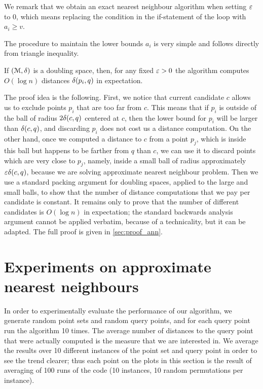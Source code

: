 We remark that we obtain an exact nearest neighbour algorithm
when setting $\varepsilon$ to $0$, which means 
replacing the condition in the if-statement of the loop
with $a_i\geq v$.

The procedure to maintain the lower bounds $a_i$
is very simple and follows directly
from triangle inequality.

\begin{algorithmic}
    \EndFor
\EndProcedure
\end{algorithmic}

\begin{theorem}
\label{thm:ann_bound}
    If $(\mathcal{M}, \delta)$ is a doubling space, then, for any fixed $\varepsilon > 0$ the
    algorithm computes $O(\log n)$ distances $\delta(p_i, q)$ in expectation.
\end{theorem}

The proof idea is the following. First, we notice
that current candidate $c$ allows us to exclude points
$p_i$ that are too far from $c$. This means that if $p_i$ is
outside of the ball of radius $2\delta(c, q)$ centered at $c$, then the lower
bound for $p_i$ will be larger than $\delta(c, q)$,
and discarding $p_i$ does not cost us a distance computation.
On the other hand, once we computed a distance to $c$
from a point $p_j$, which is inside this ball but happens to be farther from $q$ than $c$,
we can use it to discard points which are very close to $p_j$, 
namely, inside a small ball of radius approximately $\varepsilon \delta(c, q)$, because we
are solving approximate nearest neighbour problem.
Then we use a standard packing argument for doubling spaces, applied to the large and small balls, to show
that the number of distance computations that we pay per candidate is constant.
It remains only to prove that the number of different candidates is $O(\log n)$
in expectation; the standard
backwards analysis argument cannot be applied verbatim, because of a technicality,
but it can be adapted.
The full proof is given in \cref{sec:proof_ann}.

\section{Experiments on approximate nearest neighbours}
\label{sec:experiment_ann}

In order to experimentally evaluate the performance of our algorithm,
we generate random point sets and random query points, and for each query point
run the algorithm 10 times. The average number of distances to the query point
that were actually computed is the measure that we are interested in.
We average the results over 10 different instances of the point
set and query point in order to see the trend clearer; thus
each point on the plots in this section is the result of averaging of 100 runs
of the code (10 instances, 10 random permutations per instance).

